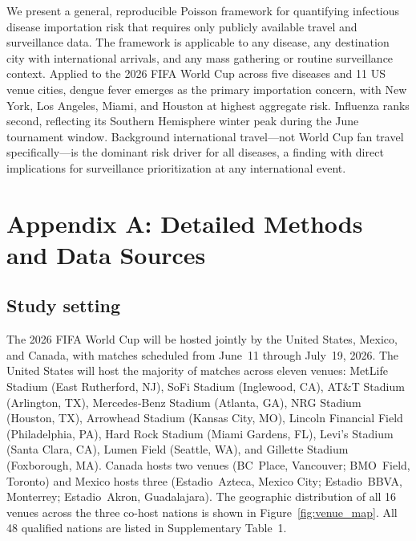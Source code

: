 \documentclass[12pt]{article}
\begin{document}
We present a general, reproducible Poisson framework for quantifying
infectious disease importation risk that requires only publicly
available travel and surveillance data. The framework is applicable
to any disease, any destination city with international arrivals,
and any mass gathering or routine surveillance context. Applied to
the 2026 FIFA World Cup across five diseases and 11 US venue cities,
dengue fever emerges as the primary importation concern, with New
York, Los Angeles, Miami, and Houston at highest aggregate risk.
Influenza ranks second, reflecting its Southern Hemisphere winter
peak during the June tournament window. Background international
travel---not World Cup fan travel specifically---is the dominant
risk driver for all diseases, a finding with direct implications for
surveillance prioritization at any international event.




\newpage
\appendix

\section*{Appendix A: Detailed Methods and Data Sources}

\subsection*{Study setting}

The 2026 FIFA World Cup will be hosted jointly by the United States,
Mexico, and Canada, with matches scheduled from June~11 through
July~19, 2026. The United States will host the majority of matches
across eleven venues: MetLife Stadium (East Rutherford, NJ), SoFi
Stadium (Inglewood, CA), AT\&T Stadium (Arlington, TX), Mercedes-Benz
Stadium (Atlanta, GA), NRG Stadium (Houston, TX), Arrowhead Stadium
(Kansas City, MO), Lincoln Financial Field (Philadelphia, PA), Hard
Rock Stadium (Miami Gardens, FL), Levi's Stadium (Santa Clara, CA),
Lumen Field (Seattle, WA), and Gillette Stadium (Foxborough, MA).
Canada hosts two venues (BC~Place, Vancouver; BMO~Field, Toronto) and
Mexico hosts three (Estadio~Azteca, Mexico City; Estadio~BBVA,
Monterrey; Estadio~Akron, Guadalajara). The geographic distribution
of all 16 venues across the three co-host nations is shown in
Figure~\ref{fig:venue_map}.
All 48 qualified nations are listed in Supplementary Table~1.
\end{document}
